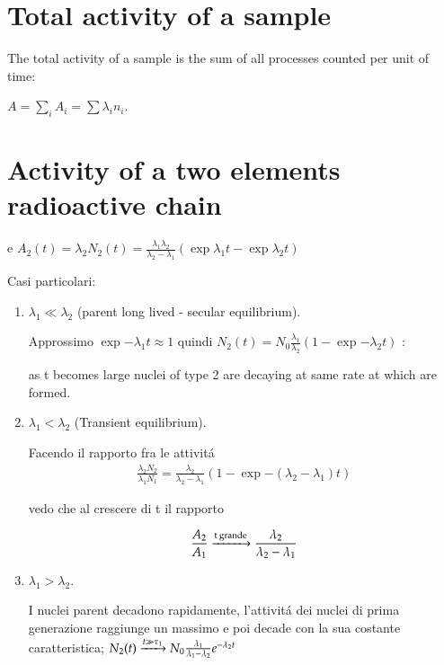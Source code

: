 \documentclass[main.tex]{subfiles}
\newcommand{\mblock}[1]{ {\allowbreak $#1$ }}
\begin{document}
\section{Total activity of a sample}

The total activity of a sample is the sum of all processes counted per unit of time:

$A=\sum_iA_i=\sum\lambda_in_i$.

\section{Activity of a two elements radioactive chain}

 e \mblock{A_2(t)=\lambda_2N_2(t)=\frac{\lambda_1\lambda_2}{\lambda_2-\lambda_1}(\exp{\lambda_1t}-\exp{\lambda_2t})}

Casi particolari:

\begin{enumerate}

\item $\lambda_1\ll\lambda_2$ (parent long lived - secular equilibrium).

Approssimo $\exp{-\lambda_1}t\approx1$ quindi \mblock{N_2(t)=N_0\frac{\lambda_1}{\lambda_2}(1-\exp{-\lambda_2 t})}:

as t becomes large nuclei of type 2 are decaying at same rate at which are formed. 


\item $\lambda_1<\lambda_2$ (Transient equilibrium).

Facendo il rapporto fra le attivit\'a
\begin{align*}
\frac{\lambda_2N_2}{\lambda_1N_1}=\frac{\lambda_2}{\lambda_2-\lambda_1}(1-\exp{-(\lambda_2-\lambda_1)t})
\end{align*}

vedo che al crescere di t il rapporto

\begin{align*}
\frac{A_2}{A_1}\xrightarrow{\text{t grande}}\frac{\lambda_2}{\lambda_2-\lambda_1}
\end{align*}


\item $\lambda_1>\lambda_2$.

I nuclei parent decadono rapidamente, l'attivit\'a dei nuclei di prima generazione raggiunge un massimo e poi decade con la sua costante caratteristica; $N_2(t)\xrightarrow{t\gg\tau_1}N_0\frac{\lambda_1}{\lambda_1-\lambda_2}e^{-\lambda_2t}$

\end{enumerate}
\end{document}
